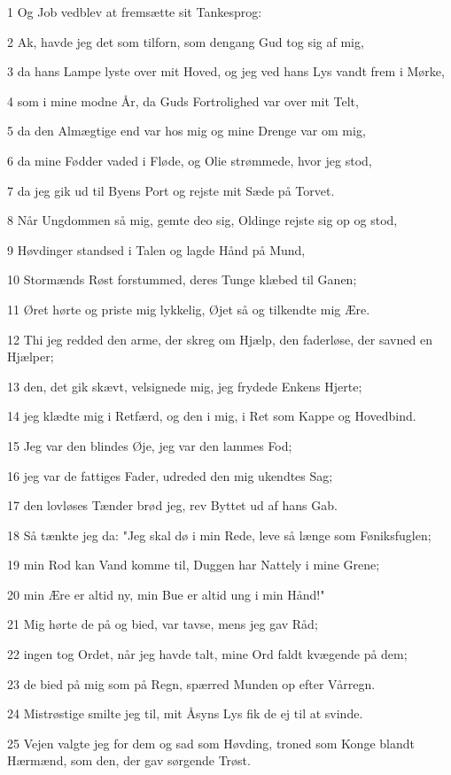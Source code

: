 \par 1 Og Job vedblev at fremsætte sit Tankesprog:
\par 2 Ak, havde jeg det som tilforn, som dengang Gud tog sig af mig,
\par 3 da hans Lampe lyste over mit Hoved, og jeg ved hans Lys vandt frem i Mørke,
\par 4 som i mine modne År, da Guds Fortrolighed var over mit Telt,
\par 5 da den Almægtige end var hos mig og mine Drenge var om mig,
\par 6 da mine Fødder vaded i Fløde, og Olie strømmede, hvor jeg stod,
\par 7 da jeg gik ud til Byens Port og rejste mit Sæde på Torvet.
\par 8 Når Ungdommen så mig, gemte deo sig, Oldinge rejste sig op og stod,
\par 9 Høvdinger standsed i Talen og lagde Hånd på Mund,
\par 10 Stormænds Røst forstummed, deres Tunge klæbed til Ganen;
\par 11 Øret hørte og priste mig lykkelig, Øjet så og tilkendte mig Ære.
\par 12 Thi jeg redded den arme, der skreg om Hjælp, den faderløse, der savned en Hjælper;
\par 13 den, det gik skævt, velsignede mig, jeg frydede Enkens Hjerte;
\par 14 jeg klædte mig i Retfærd, og den i mig, i Ret som Kappe og Hovedbind.
\par 15 Jeg var den blindes Øje, jeg var den lammes Fod;
\par 16 jeg var de fattiges Fader, udreded den mig ukendtes Sag;
\par 17 den lovløses Tænder brød jeg, rev Byttet ud af hans Gab.
\par 18 Så tænkte jeg da: "Jeg skal dø i min Rede, leve så længe som Føniksfuglen;
\par 19 min Rod kan Vand komme til, Duggen har Nattely i mine Grene;
\par 20 min Ære er altid ny, min Bue er altid ung i min Hånd!"
\par 21 Mig hørte de på og bied, var tavse, mens jeg gav Råd;
\par 22 ingen tog Ordet, når jeg havde talt, mine Ord faldt kvægende på dem;
\par 23 de bied på mig som på Regn, spærred Munden op efter Vårregn.
\par 24 Mistrøstige smilte jeg til, mit Åsyns Lys fik de ej til at svinde.
\par 25 Vejen valgte jeg for dem og sad som Høvding, troned som Konge blandt Hærmænd, som den, der gav sørgende Trøst.

